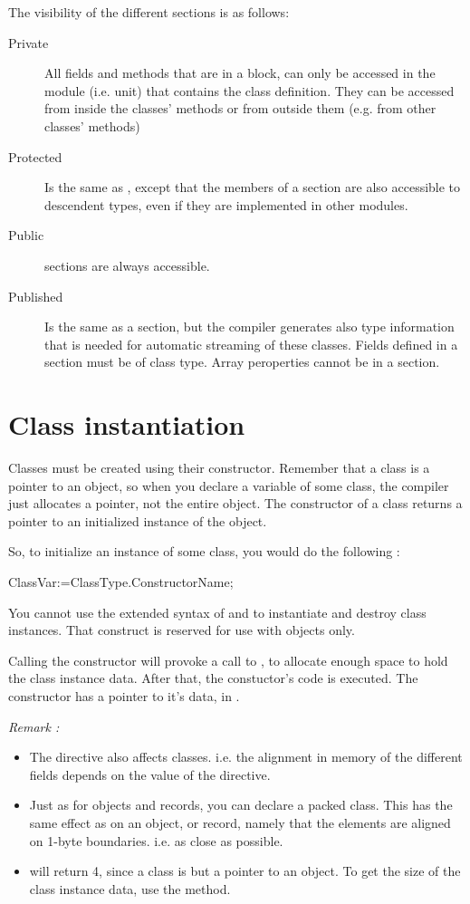 \documentclass{report}
\begin{document}
The visibility of the different sections is as follows:
\begin{description}
\item [Private\ ] All fields and methods that are in a  block, can 
only be accessed in the module (i.e. unit) that contains the class definition.
They can be accessed from inside the classes' methods or from outside them
(e.g. from other classes' methods)
\item [Protected\ ] Is the same as , except that the members of
a  section are also accessible to descendent types, even if
they are implemented in other modules.
\item [Public\ ] sections are always accessible.
\item [Published\ ] Is the same as a  section, but the compiler
generates also type information that is needed for automatic streaming of
these classes. Fields defined in a  section must be of class type.
Array peroperties cannot be in a  section.
\end{description}

\section{Class instantiation}

Classes must be created using their constructor. Remember that a class is a
pointer to an object, so when you declare a variable of some class, the
compiler just allocates a pointer, not the entire object. The constructor of
a class returns a pointer to an initialized instance of the object.

So, to initialize an instance of some class, you would do the following :
\begin{listing}
  ClassVar:=ClassType.ConstructorName;
\end{listing}
You cannot use the extended syntax of  and  to
instantiate and destroy class instances. 
That construct is reserved for use with objects only.

Calling the constructor will provoke a call to , to allocate
enough space to hold the class instance data. 
After that, the constuctor's code is executed. 
The constructor has a pointer to it's data, in .

{\em Remark :}
\begin{itemize}
\item The  directive also affects classes.
i.e. the alignment in memory of the different fields depends on the
value of  the  directive.
\item Just as for objects and records, you can declare a packed class.
This has the same effect as on an object, or record, namely that the
elements are aligned on 1-byte boundaries. i.e. as close as possible.
\item {} will return 4, since a class is but a pointer to
an object. To get the size of the class instance data, use the 
 method.
\end{itemize}
\end{document}
